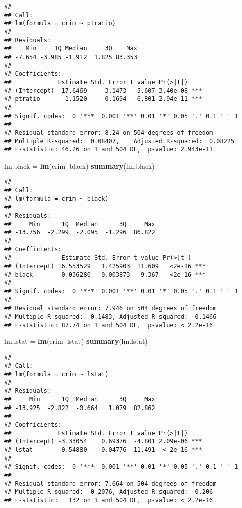 \documentclass[]{article}
\newenvironment{Shaded}{\begin{snugshade}}{\end{snugshade}}
\newcommand{\KeywordTok}[1]{\textcolor[rgb]{0.13,0.29,0.53}{\textbf{#1}}}
\newcommand{\NormalTok}[1]{#1}
\newcommand{\OperatorTok}[1]{\textcolor[rgb]{0.81,0.36,0.00}{\textbf{#1}}}
\newcommand{\StringTok}[1]{\textcolor[rgb]{0.31,0.60,0.02}{#1}}
\begin{document}
\begin{verbatim}
## 
## Call:
## lm(formula = crim ~ ptratio)
## 
## Residuals:
##    Min     1Q Median     3Q    Max 
## -7.654 -3.985 -1.912  1.825 83.353 
## 
## Coefficients:
##             Estimate Std. Error t value Pr(>|t|)    
## (Intercept) -17.6469     3.1473  -5.607 3.40e-08 ***
## ptratio       1.1520     0.1694   6.801 2.94e-11 ***
## ---
## Signif. codes:  0 '***' 0.001 '**' 0.01 '*' 0.05 '.' 0.1 ' ' 1
## 
## Residual standard error: 8.24 on 504 degrees of freedom
## Multiple R-squared:  0.08407,    Adjusted R-squared:  0.08225 
## F-statistic: 46.26 on 1 and 504 DF,  p-value: 2.943e-11
\end{verbatim}

\begin{Shaded}
\begin{Highlighting}[]
\NormalTok{lm.black =}\StringTok{ }\KeywordTok{lm}\NormalTok{(crim}\OperatorTok{~}\NormalTok{black)}
\KeywordTok{summary}\NormalTok{(lm.black)}
\end{Highlighting}
\end{Shaded}

\begin{verbatim}
## 
## Call:
## lm(formula = crim ~ black)
## 
## Residuals:
##     Min      1Q  Median      3Q     Max 
## -13.756  -2.299  -2.095  -1.296  86.822 
## 
## Coefficients:
##              Estimate Std. Error t value Pr(>|t|)    
## (Intercept) 16.553529   1.425903  11.609   <2e-16 ***
## black       -0.036280   0.003873  -9.367   <2e-16 ***
## ---
## Signif. codes:  0 '***' 0.001 '**' 0.01 '*' 0.05 '.' 0.1 ' ' 1
## 
## Residual standard error: 7.946 on 504 degrees of freedom
## Multiple R-squared:  0.1483, Adjusted R-squared:  0.1466 
## F-statistic: 87.74 on 1 and 504 DF,  p-value: < 2.2e-16
\end{verbatim}

\begin{Shaded}
\begin{Highlighting}[]
\NormalTok{lm.lstat =}\StringTok{ }\KeywordTok{lm}\NormalTok{(crim}\OperatorTok{~}\NormalTok{lstat)}
\KeywordTok{summary}\NormalTok{(lm.lstat)}
\end{Highlighting}
\end{Shaded}

\begin{verbatim}
## 
## Call:
## lm(formula = crim ~ lstat)
## 
## Residuals:
##     Min      1Q  Median      3Q     Max 
## -13.925  -2.822  -0.664   1.079  82.862 
## 
## Coefficients:
##             Estimate Std. Error t value Pr(>|t|)    
## (Intercept) -3.33054    0.69376  -4.801 2.09e-06 ***
## lstat        0.54880    0.04776  11.491  < 2e-16 ***
## ---
## Signif. codes:  0 '***' 0.001 '**' 0.01 '*' 0.05 '.' 0.1 ' ' 1
## 
## Residual standard error: 7.664 on 504 degrees of freedom
## Multiple R-squared:  0.2076, Adjusted R-squared:  0.206 
## F-statistic:   132 on 1 and 504 DF,  p-value: < 2.2e-16
\end{verbatim}
\end{document}
